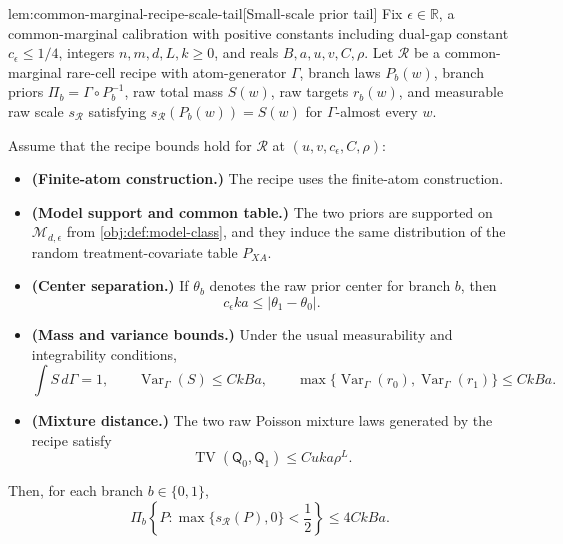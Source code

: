 \documentclass[11pt]{article}
\begin{document}
\begin{lemmav}{lem:common-marginal-recipe-scale-tail}[Small-scale prior tail]
Fix \(\epsilon\in\mathbb R\), a common-marginal calibration with positive constants including dual-gap constant \(c_\epsilon\le 1/4\), integers \(n,m,d,L,k\ge0\), and reals \(B,a,u,v,C,\rho\).  Let \(\mathcal R\) be a common-marginal rare-cell recipe with atom-generator \(\Gamma\), branch laws \(P_b(w)\), branch priors \(\Pi_b=\Gamma\circ P_b^{-1}\), raw total mass \(S(w)\), raw targets \(r_b(w)\), and measurable raw scale \(s_{\mathcal R}\) satisfying \(s_{\mathcal R}(P_b(w))=S(w)\) for \(\Gamma\)-almost every \(w\).

Assume that the recipe bounds hold for \(\mathcal R\) at \((u,v,c_\epsilon,C,\rho)\):
\begin{itemize}
\item \textbf{(Finite-atom construction.)} The recipe uses the finite-atom construction.
\item \textbf{(Model support and common table.)} The two priors are supported on \(\mathcal M_{d,\epsilon}\) from \cref{obj:def:model-class}, and they induce the same distribution of the random treatment-covariate table \(P_{XA}\).
\item \textbf{(Center separation.)} If \(\theta_b\) denotes the raw prior center for branch \(b\), then
\[
c_\epsilon k a \le |\theta_1-\theta_0|.
\]
\item \textbf{(Mass and variance bounds.)} Under the usual measurability and integrability conditions,
\[
\int S\,d\Gamma=1,\qquad
\operatorname{Var}_{\Gamma}(S)\le CkBa,\qquad
\max\{\operatorname{Var}_{\Gamma}(r_0),\operatorname{Var}_{\Gamma}(r_1)\}\le CkBa.
\]
\item \textbf{(Mixture distance.)} The two raw Poisson mixture laws generated by the recipe satisfy
\[
\operatorname{TV}(\mathsf Q_0,\mathsf Q_1)\le Cuka\rho^L.
\]
\end{itemize}
Then, for each branch \(b\in\{0,1\}\),
\[
\Pi_b\!\left\{P:\max\{s_{\mathcal R}(P),0\}<\frac12\right\}
\le 4CkBa .
\]
\end{lemmav}
\end{document}
